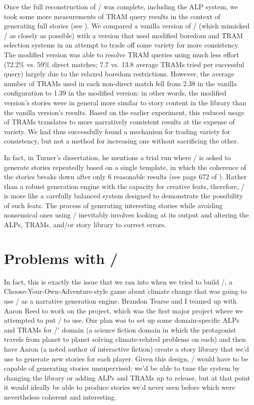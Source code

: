 Once the full reconstruction of \minstrel/ was complete, including the ALP system, we took some more measurements of TRAM query results in the context of generating full stories (see \citep{Tearse2012}).
%
We compared a vanilla version of \skald/ (which mimicked \minstrel/ as closely as possible) with a version that used modified boredom and TRAM selection systems in an attempt to trade off some variety for more consistency.
%
The modified version was able to resolve TRAM queries using much less effort (72.2\% vs. 59\% direct matches; 7.7 vs. 13.8 average TRAMs tried per successful query) largely due to the relaxed boredom restrictions.
%
However, the average number of TRAMs used in each non-direct match fell from 2.38 in the vanilla configuration to 1.39 in the modified version: in other words, the modified version's stories were in general more similar to story content in the library than the vanilla version's results.
%
Based on the earlier experiment, this reduced usage of TRAMs translates to more narratively consistent results at the expense of variety. 
%
We had thus successfully found a mechanism for trading variety for consistency, but not a method for increasing one without sacrificing the other.


In fact, in Turner's dissertation, he mentions a trial run where \minstrel/ is asked to generate stories repeatedly based on a single template, in which the coherence of the stories breaks down after only 6 reasonable results (see page 672 of \citep{Turner1993}).
%
Rather than a robust generation engine with the capacity for creative feats, therefore, \minstrel/ is more like a carefully balanced system designed to demonstrate the possibility of such feats.
%
The process of generating interesting stories while avoiding nonsensical ones using \minstrel/ inevitably involves looking at its output and altering the ALPs, TRAMs, and/or story library to correct errors.


\section{Problems with \problemplanets/}

\label{sec:problem-planets-problems}

In fact, this is exactly the issue that we ran into when we tried to build \problemplanets/, a Choose-Your-Own-Adventure-style game about climate change that was going to use \skald/ as a narrative generation engine.
%
Brandon Tearse and I teamed up with Aaron Reed to work on the project, which was the first major project where we attempted to put \skald/ to use.
%
Our plan was to set up some domain-specific ALPs and TRAMs for \problemplanets/' domain (a science fiction domain in which the protagonist travels from planet to planet solving climate-related problems on each) and then have Aaron (a noted author of interactive fiction) create a story library that we'd use to generate new stories for each player.
%
Given this design, \skald/ would have to be capable of generating stories unsupervised: we'd be able to tune the system by changing the library or adding ALPs and TRAMs up to release, but at that point it would ideally be able to produce stories we'd never seen before which were nevertheless coherent and interesting.


